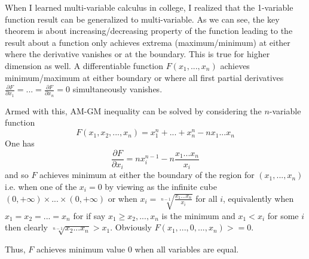 \documentclass[10pt]{amsart}
\begin{document}
When I learned multi-variable calculus in college, I realized that the 1-variable function result can be generalized to multi-variable. As we can see, the key theorem is about increasing/decreasing property of the function leading to the result about a function only achieves extrema (maximum/minimum) at either where the derivative vanishes or at the boundary. This is true for higher dimension as well. A differentiable function $F(x_1, ..., x_n)$ achieves minimum/maximum at either boundary or where all first partial derivatives $\frac{\partial F}{\partial x_1} = ... = \frac{\partial F}{\partial x_n} = 0$ simultaneously vanishes.

Armed with this, AM-GM inequality can be solved by considering the $n$-variable function
$$F(x_1,x_2,...,x_n) = x_1^n + ... + x_n^n - n x_1 ... x_n$$
One has
$$\frac{\partial F}{\partial x_i} = n x_i^{n-1} - n \frac{x_1 ... x_n}{x_i}$$
and so $F$ achieves minimum at either the boundary of the region for $(x_1,...,x_n)$ i.e. when one of the $x_i = 0$ by viewing as the infinite cube $(0,+\infty) \times ... \times (0,+\infty)$ or when $x_i = \sqrt[n-1]{\frac{x_1 ... x_n}{x_i}}$ for all $i$, equivalently when $x_1 = x_2 = ... = x_n$ for if say $x_1 \geq x_2, ..., x_n$ is the minimum and $x_1 < x_i$ for some $i$ then clearly $\sqrt[n-1]{x_2 ... x_n} > x_1$. Obviously $F(x_1, ..., 0, ..., x_n) >= 0$.

Thus, $F$ achieves minimum value 0 when all variables are equal.
\end{document}
